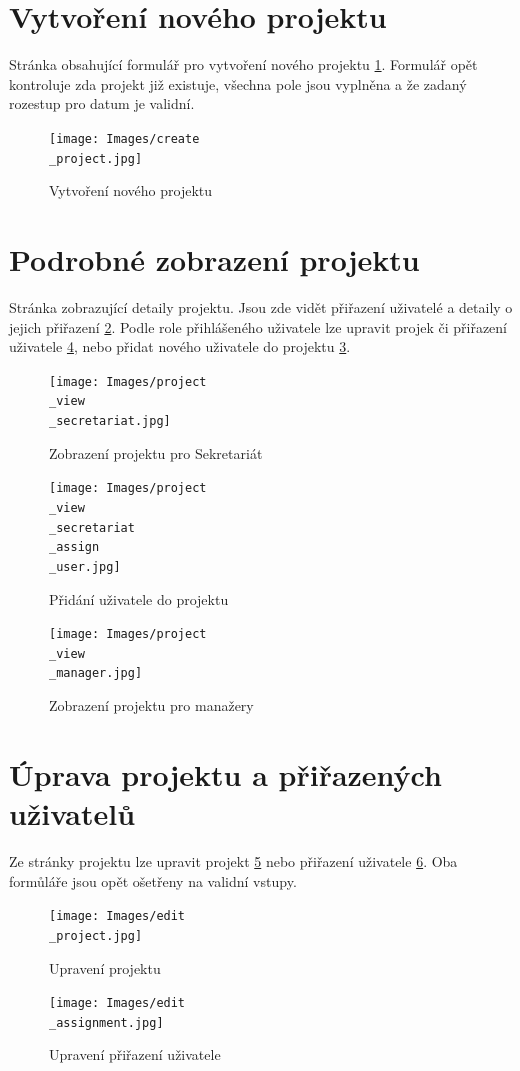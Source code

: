 \documentclass[czech,P5]{thesiskiv}
\begin{document}
\section{Vytvoření nového projektu}
Stránka obsahující formulář pro vytvoření nového projektu \ref{fig:createproject}. Formulář opět kontroluje zda projekt již existuje, všechna pole jsou vyplněna a že zadaný rozestup pro datum je validní.
 \begin{figure}[H]
	\centering
	\texttt{[image: Images/create\\\_project.jpg]}
	\caption{Vytvoření nového projektu}
	\label{fig:createproject} 
\end{figure}
\newpage

\section{Podrobné zobrazení projektu}
Stránka zobrazující detaily projektu. Jsou zde vidět přiřazení uživatelé a detaily o jejich přiřazení \ref{fig:viewProjectSec}. Podle role přihlášeného uživatele lze upravit projek či přiřazení uživatele \ref{fig:viewProjectMan}, nebo přidat nového uživatele do projektu \ref{fig:viewProjectAdd}. 
 \begin{figure}[H]
	\centering
	\texttt{[image: Images/project\\\_view\\\_secretariat.jpg]}
	\caption{Zobrazení projektu pro Sekretariát}
	\label{fig:viewProjectSec} 
\end{figure}
 \begin{figure}[H]
	\centering
	\texttt{[image: Images/project\\\_view\\\_secretariat\\\_assign\\\_user.jpg]}
	\caption{Přidání uživatele do projektu}
	\label{fig:viewProjectAdd} 
\end{figure}
 \begin{figure}[H]
	\centering
	\texttt{[image: Images/project\\\_view\\\_manager.jpg]}
	\caption{Zobrazení projektu pro manažery}
	\label{fig:viewProjectMan} 
\end{figure}

\section{Úprava projektu a přiřazených uživatelů}
Ze stránky projektu lze upravit projekt \ref{fig:editProject} nebo přiřazení uživatele \ref{fig:editAssignment}. Oba formůláře jsou opět ošetřeny na validní vstupy.  
 \begin{figure}[H]
	\centering
	\texttt{[image: Images/edit\\\_project.jpg]}
	\caption{Upravení projektu}
	\label{fig:editProject} 
\end{figure}
 \begin{figure}[H]
	\centering
	\texttt{[image: Images/edit\\\_assignment.jpg]}
	\caption{Upravení přiřazení uživatele}
	\label{fig:editAssignment} 
\end{figure}
\newpage
\end{document}
